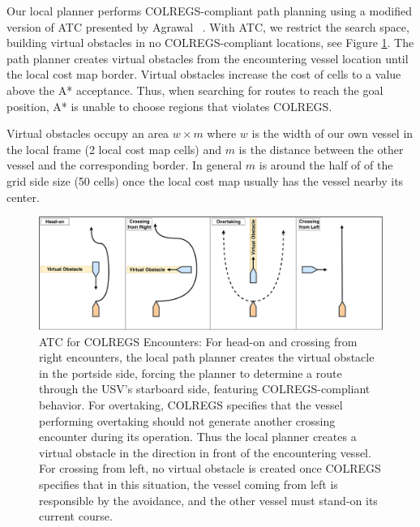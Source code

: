             Our local planner performs COLREGS-compliant path planning using a modified version of \ac{ATC} presented by Agrawal \etal~\cite{Agrawal2015COLREGS}. With \ac{ATC}, we restrict the search space, building virtual obstacles in no COLREGS-compliant locations, see Figure \ref{fig:atc}. The path planner creates virtual obstacles from the encountering vessel location until the local cost map border. Virtual obstacles increase the cost of cells to a value above the A* acceptance. Thus, when searching for routes to reach the goal position, A* is unable to choose regions that violates COLREGS.
            
            Virtual obstacles occupy an area $w \times m$ where $w$ is the width of our own vessel in the local frame (2 local cost map cells) and $m$ is the distance between the other vessel and the corresponding border. In general $m$ is around the half of of the grid side size (50 cells) once the local cost map usually has the vessel nearby its center. 
            
            \begin{figure}[H]
                \centering
                \includegraphics[scale=0.32]{figs/Chap4/atc.pdf}
                \caption{\ac{ATC} for COLREGS Encounters: For head-on and crossing from right encounters, the local path planner creates the virtual obstacle in the portside side, forcing the planner to determine a route through the \ac{USV}'s starboard side, featuring COLREGS-compliant behavior. For overtaking, COLREGS specifies that the vessel performing overtaking should not generate another crossing encounter during its operation. Thus the local planner creates a virtual obstacle in the direction in front of the encountering vessel. For crossing from left, no virtual obstacle is created once COLREGS specifies that in this situation, the vessel coming from left is responsible by the avoidance, and the other vessel must stand-on its current course.
                }
                \label{fig:atc}
            \end{figure}

